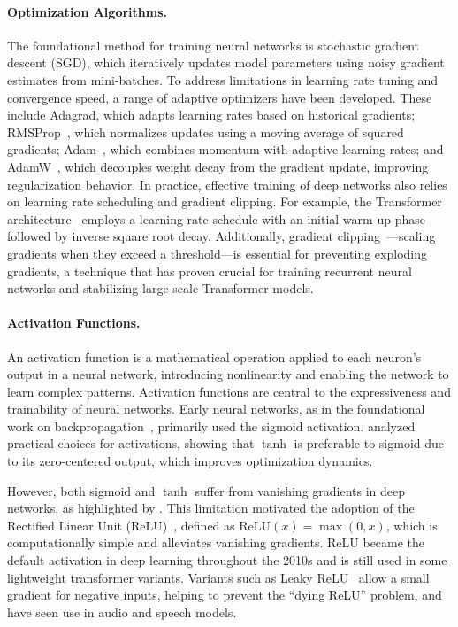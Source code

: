 \paragraph{Optimization Algorithms.} The foundational method for training neural networks is stochastic gradient descent (SGD)\citep{robbins1951stochastic}, which iteratively updates model parameters using noisy gradient estimates from mini-batches. To address limitations in learning rate tuning and convergence speed, a range of adaptive optimizers have been developed. These include Adagrad\citep{duchi2011adaptive}, which adapts learning rates based on historical gradients; RMSProp~\citep{tieleman2012lecture}, which normalizes updates using a moving average of squared gradients; Adam~\citep{kingma2015adam}, which combines momentum with adaptive learning rates; and AdamW~\citep{loshchilov2019decoupled}, which decouples weight decay from the gradient update, improving regularization behavior.
In practice, effective training of deep networks also relies on learning rate scheduling and gradient clipping. For example, the Transformer architecture~\citep{vaswani2017attention} employs a learning rate schedule with an initial warm-up phase followed by inverse square root decay. Additionally, gradient clipping~\citep{pascanu2013difficulty}—scaling gradients when they exceed a threshold—is essential for preventing exploding gradients, a technique that has proven crucial for training recurrent neural networks and stabilizing large-scale Transformer models.

\paragraph{Activation Functions.} 

An activation function is a mathematical operation applied to each neuron's output in a neural network, introducing nonlinearity and enabling the network to learn complex patterns. Activation functions are central to the expressiveness and trainability of neural networks. Early neural networks, as in the foundational work on backpropagation~\citep{rumelhart1986learning}, primarily used the sigmoid activation. \citet{lecun1998efficient} analyzed practical choices for activations, showing that $\tanh$ is preferable to sigmoid due to its zero-centered output, which improves optimization dynamics.

However, both sigmoid and $\tanh$ suffer from vanishing gradients in deep networks, as highlighted by \citet{glorot2010understanding}. This limitation motivated the adoption of the Rectified Linear Unit (ReLU)~\citep{nair2010rectified}, defined as $\mathrm{ReLU}(x) = \max(0, x)$, which is computationally simple and alleviates vanishing gradients. ReLU became the default activation in deep learning throughout the 2010s and is still used in some lightweight transformer variants. Variants such as Leaky ReLU~\citep{maas2013rectifier} allow a small gradient for negative inputs, helping to prevent the ``dying ReLU'' problem, and have seen use in audio and speech models.

